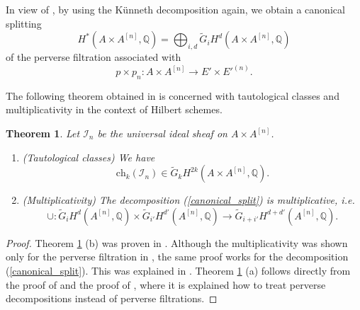 \documentclass[11pt]{amsart}
\theoremstyle{plain}
\newtheorem{thm}{Theorem}[section]
\theoremstyle{definition}
\theoremstyle{remark}
\newcommand{\BQ}{{\mathbb{Q}}}
\newcommand{\CI}{{\mathcal I}}
\begin{document}
 In view of \cite[Proposition 2.1]{Z},  by using the K\"unneth decomposition again, we obtain a canonical splitting 
\begin{equation}\label{splitting0}
H^\ast(A\times A^{[n]}, \BQ) = \bigoplus_{i,d} \widetilde{G}_i H^d(A \times A^{[n]}, \BQ)
\end{equation}
of the perverse filtration associated with
\[
p \times p_n: A \times A^{[n]} \to E' \times E'^{(n)}.
\]


The following theorem obtained in \cite{Z, SZ} is concerned with  tautological classes and  multiplicativity in the context of Hilbert schemes. 

\begin{thm}\label{taut_Hilb}
Let $\CI_n$ be the universal ideal sheaf on $A \times A^{[n]}$. 
\begin{enumerate}
    \item[(a)](Tautological classes) We have
    \[
    \mathrm{ch}_k(\CI_n) \in \widetilde{G}_k H^{2k}(A\times A^{[n]}, \BQ).
    \]
    \item[(b)](Multiplicativity) The decomposition  (\ref{canonical_split}) is multiplicative, i.e.
    \[
   \cup:  \widetilde{G}_i H^d(A^{[n]}, \BQ) \times \widetilde{G}_{i'} H^{d'}(A^{[n]}, \BQ) \to \widetilde{G}_{i+i'}H^{d+d'}(A^{[n]}, \BQ).
    \]
\end{enumerate}
\end{thm}

\begin{proof}
Theorem \ref{taut_Hilb} (b) was proven in \cite{Z}. Although the multiplicativity was shown only for the perverse filtration in \cite{Z}, the same proof works for  the decomposition (\ref{canonical_split}).  This was explained in \cite[Proposition 1.8]{SZ}. Theorem \ref{taut_Hilb} (a) follows directly from the proof of \cite[Theorem 0.1]{SZ} and the proof of \cite[Theorem 3.3]{SZ}, where it is explained how to treat perverse decompositions instead of perverse filtrations. 
\end{proof}

\end{document}
